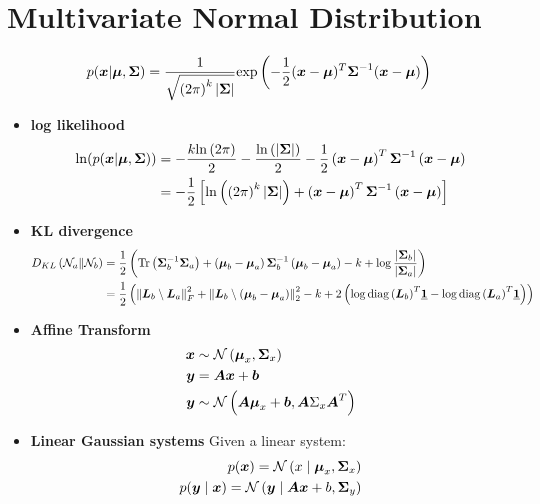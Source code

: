 \documentclass{article}
\begin{document}
\section{Multivariate Normal Distribution}
\begin{align}
  p(\vx| \vmu, \vSigma) = \dfrac{1}{\sqrt{\group{2 \pi}^k \abs{\vSigma}}}
    \func{\exp}{-\dfrac{1}{2} (\vx - \vmu)^T \vSigma^{-1} (\vx - \vmu)}
\end{align}
\begin{itemize}
  \item \textbf{log likelihood}
  \begin{align*}
    \ln(p(\vx | \vmu, \vSigma))
      & = -\dfrac{k \func{\ln}{2 \pi}}{2} -\dfrac{\func{\ln}{\abs{\vSigma}}}{2}
          -\dfrac{1}{2}\group{\vx - \vmu}^T \vSigma^{-1} \group{\vx - \vmu} \\
      & = -\dfrac{1}{2} \sgroup{\func{\ln}{\group{2 \pi}^k \abs{\vSigma}}
            + \group{\vx - \vmu}^T \vSigma^{-1} \group{\vx - \vmu}
                                }
  \end{align*}
  \item \textbf{KL divergence}
  \begin{align*}
    \func{D_{KL}}{{\cal N}_a \| {\cal N}_b }
      & = \dfrac{1}{2}\group{
        \Tr{\vSigma_b^{-1} \vSigma_a}
        + \group{\vmu_b - \vmu_a} \vSigma_b^{-1} \group{\vmu_b - \vmu_a}
        - k + \log{\dfrac{\abs{\vSigma_b}}{\abs{\vSigma_a}}}
        } \\
      & = \dfrac{1}{2}\group{
        \fnorm{\vL_b \solve \vL_a}^2
        + \ltwogroup{\vL_b \solve \group{\vmu_b - \vmu_a}}^2
        - k + 2\group{  \log{\func{\diag}{{\vL_b}}^T \ones}
                      - \log{\func{\diag}{{\vL_a}}^T \ones} }
        }
  \end{align*}
  \item \textbf{Affine Transform}
  \begin{align*}
    \vx &\sim \normal{\vmu_x, \vSigma_x} \\
    \vy &= \vA \vx + \vb \\
    \vy &\sim \normal{\vA \vmu_x + \vb, \vA \Sigma_x \vA^T}
  \end{align*}
  \item \textbf{Linear Gaussian systems}
    Given a linear system:
    \begin{align*}
      p(\vx) = \normal{x \given \vmu_x, \vSigma_x} \\
      p(\vy \given \vx) = \normal{\vy \given \vA \vx + b, \vSigma_y}

\end{align*}
\end{itemize}
\end{document}
